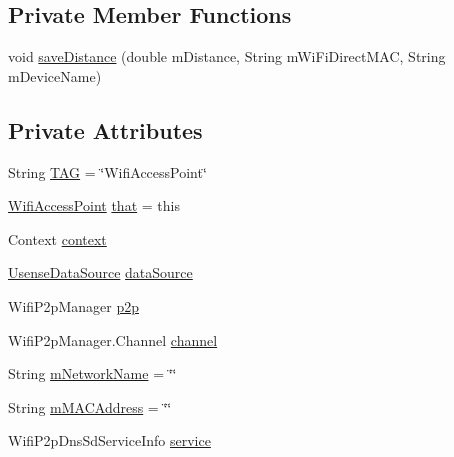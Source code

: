 \subsection*{Private Member Functions}
\begin{DoxyCompactItemize}
\item 
void \hyperlink{classcs_1_1usense_1_1location_1_1_wifi_access_point_ab725ad551b522d5938b039f41e79e280}{save\+Distance} (double m\+Distance, String m\+Wi\+Fi\+Direct\+M\+A\+C, String m\+Device\+Name)
\end{DoxyCompactItemize}
\subsection*{Private Attributes}
\begin{DoxyCompactItemize}
\item 
String \hyperlink{classcs_1_1usense_1_1location_1_1_wifi_access_point_a87b8835d83e55010b41b2621ebdbcfd1}{T\+A\+G} = \char`\"{}Wifi\+Access\+Point\char`\"{}
\item 
\hyperlink{classcs_1_1usense_1_1location_1_1_wifi_access_point}{Wifi\+Access\+Point} \hyperlink{classcs_1_1usense_1_1location_1_1_wifi_access_point_afe22ca0f9a637b92889a09bc152ad2b5}{that} = this
\item 
Context \hyperlink{classcs_1_1usense_1_1location_1_1_wifi_access_point_a915b21207eb4aaed1293221cd1fc5b19}{context}
\item 
\hyperlink{classcs_1_1usense_1_1db_1_1_usense_data_source}{Usense\+Data\+Source} \hyperlink{classcs_1_1usense_1_1location_1_1_wifi_access_point_a046e96970d77ff745ff03479896c6c74}{data\+Source}
\item 
Wifi\+P2p\+Manager \hyperlink{classcs_1_1usense_1_1location_1_1_wifi_access_point_ada5896bc8b9eef82a6c50fccfb26e90d}{p2p}
\item 
Wifi\+P2p\+Manager.\+Channel \hyperlink{classcs_1_1usense_1_1location_1_1_wifi_access_point_a8369fa6ef4e6cd085bdb1e0b646b1550}{channel}
\item 
String \hyperlink{classcs_1_1usense_1_1location_1_1_wifi_access_point_aa801040f056bb1bdc4a93e4feeaa8a74}{m\+Network\+Name} = \char`\"{}\char`\"{}
\item 
String \hyperlink{classcs_1_1usense_1_1location_1_1_wifi_access_point_a41728f8ebcdd2aceabf9cf94bb50e797}{m\+M\+A\+C\+Address} = \char`\"{}\char`\"{}
\item 
Wifi\+P2p\+Dns\+Sd\+Service\+Info \hyperlink{classcs_1_1usense_1_1location_1_1_wifi_access_point_a5f95d5d10ff299d16e791c6bc3be2d88}{service}

\end{DoxyCompactItemize}
